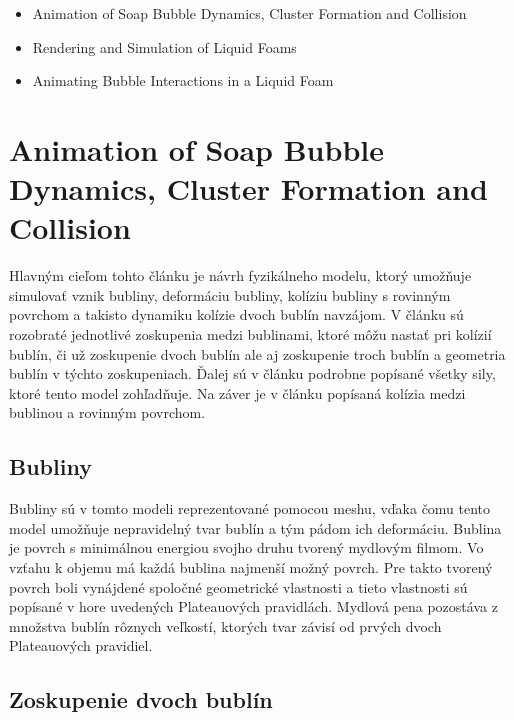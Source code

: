 \begin{itemize}
  \item Animation of Soap Bubble Dynamics, Cluster Formation and Collision \cite{durikovic2001}
  \item Rendering and Simulation of Liquid Foams \cite{sunkel2004}
  \item Animating Bubble Interactions in a Liquid Foam \cite{busaryev2012}
\end{itemize}

\section{Animation of Soap Bubble Dynamics, Cluster Formation and Collision \cite{durikovic2001}}

Hlavným cieľom tohto článku je návrh fyzikálneho modelu, ktorý umožňuje simulovať vznik bubliny, deformáciu bubliny, kolíziu bubliny s rovinným povrchom a takisto dynamiku kolízie dvoch bublín navzájom. V článku sú rozobraté jednotlivé zoskupenia medzi bublinami, ktoré môžu nastať pri kolízií bublín, či už zoskupenie dvoch bublín ale aj zoskupenie troch bublín a geometria bublín v týchto zoskupeniach. Ďalej sú v článku podrobne popísané všetky sily, ktoré tento model zohľadňuje. Na záver je v článku popísaná kolízia medzi bublinou a rovinným povrchom.

\subsection{Bubliny}

Bubliny sú v tomto modeli reprezentované pomocou meshu, vďaka čomu tento model umožňuje nepravidelný tvar bublín a tým pádom ich deformáciu. Bublina je povrch s minimálnou energiou svojho druhu tvorený mydlovým filmom. Vo vzťahu k objemu má každá bublina najmenší možný povrch. Pre takto tvorený povrch boli vynájdené spoločné geometrické vlastnosti a tieto vlastnosti sú popísané v hore uvedených Plateauových pravidlách. Mydlová pena pozostáva z množstva bublín rôznych veľkostí, ktorých tvar závisí od prvých dvoch Plateauových pravidiel.

\newpage

\subsection{Zoskupenie dvoch bublín}

